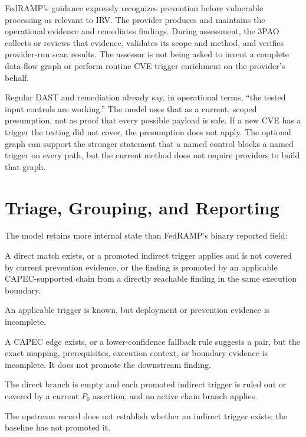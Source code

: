 \documentclass[11pt]{article}
\begin{document}
FedRAMP's guidance expressly recognizes prevention before vulnerable
processing as relevant to IRV.\cite{fedramp-ver} The provider produces and
maintains the operational evidence and remediates findings. During assessment,
the 3PAO collects or reviews that evidence, validates its scope and method, and
verifies provider-run scan results. The assessor is not being asked to invent a
complete data-flow graph or perform routine CVE trigger enrichment on the
provider's behalf.

\begin{plain}
Regular DAST and remediation already say, in operational terms, ``the tested
input controls are working.'' The model uses that as a current, scoped
presumption, not as proof that every possible payload is safe. If a new CVE has
a trigger the testing did not cover, the presumption does not apply. The
optional graph can support the stronger statement that a named control blocks a
named trigger on every path, but the current method does not require providers
to build that graph.
\end{plain}

\section{Triage, Grouping, and Reporting}
\label{sec:triage}
The model retains more internal state than FedRAMP's binary reported field:

\begin{description}[leftmargin=10em,style=nextline]
\item[Confirmed IRV] A direct match exists, or a promoted indirect trigger
  applies and is not covered by current prevention evidence, or the finding is
  promoted by an applicable CAPEC-supported chain from a directly reachable
  finding in the same execution boundary.
\item[Provisional IRV] An applicable trigger is known, but deployment or
  prevention evidence is incomplete.
\item[Chain review] A CAPEC edge exists, or a lower-confidence fallback rule
  suggests a pair, but the exact mapping, prerequisites, execution context, or
  boundary evidence is incomplete. It does not promote the downstream finding.
\item[Evidenced NIRV] The direct branch is empty and each promoted indirect
  trigger is ruled out or covered by a current $P_0$ assertion, and no active
  chain branch applies.
\item[Indirect unknown] The upstream record does not establish whether an
  indirect trigger exists; the baseline has not promoted it.
\end{description}
\end{document}
